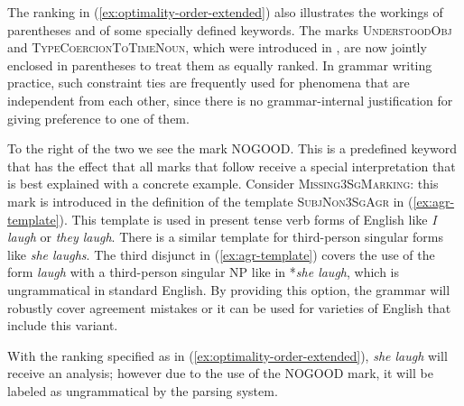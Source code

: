 \documentclass[output=paper,hidelinks]{langscibook}
\begin{document}
The ranking in (\ref{ex:optimality-order-extended}) also illustrates the workings of parentheses and of some specially defined keywords. The marks \textsc{UnderstoodObj} and \textsc{TypeCoercionToTimeNoun}, which were introduced in , are now jointly enclosed in parentheses to treat them as equally ranked. In grammar writing practice, such constraint ties are frequently used for phenomena that are independent from each other, since there is no grammar-internal justification for giving preference to one of them. %

To the right of the two we see the mark NOGOOD. This is a predefined keyword that has the effect that all marks that follow receive a special interpretation that is best explained with a concrete example.
Consider \textsc{Missing3SgMarking}: this mark is introduced in the definition of the template \textsc{SubjNon3SgAgr} in (\ref{ex:agr-template}). This template is used in pres\-ent tense verb forms of English like \emph{I laugh} or \emph{they laugh}. There is a similar template for third-person singular forms like \emph{she laughs}. The third disjunct in (\ref{ex:agr-template}) covers the use of the form \emph{laugh} with a third-person singular NP like in *\emph{she laugh}, which is ungrammatical in standard English.  By providing this option, the grammar will robustly cover agreement mistakes or it can be used for varieties of English that include this variant.

\ea \label{ex:agr-template}
\z

\noindent
With the ranking specified as in (\ref{ex:optimality-order-extended}), \emph{she laugh} will receive an analysis; however due to the use of the NOGOOD mark, it will be labeled as ungrammatical by the parsing system.
\end{document}
